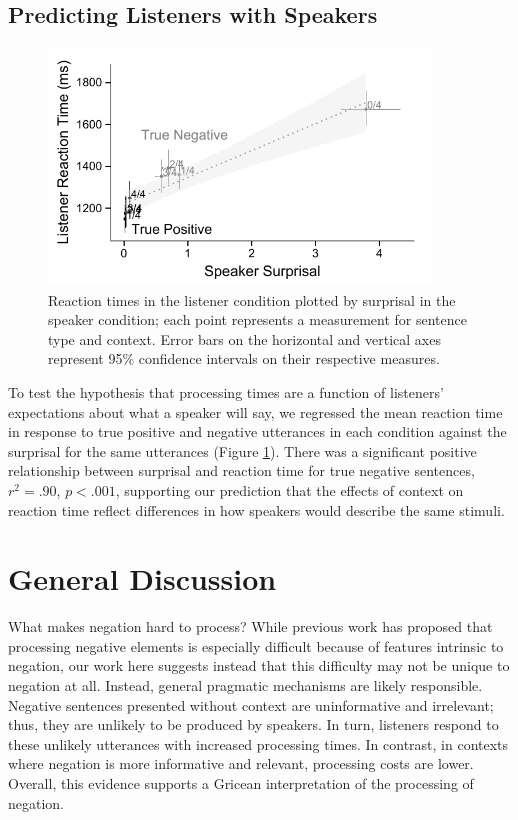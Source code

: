 \documentclass[man, noapacite]{apa2}
\begin{document}
\subsection{Predicting Listeners with Speakers}

\begin{figure}[t]
\begin{center} 
\includegraphics[width=4in]{figures/production_rts_mod.pdf}
\caption{\label{fig:scatter} Reaction times in the listener condition plotted by surprisal in the speaker condition; each point represents a measurement for sentence type and context. Error bars on the horizontal and vertical axes represent 95\% confidence intervals on their respective measures.}
\end{center} 
\end{figure}

To test the hypothesis that processing times are a function of listeners' expectations about what a speaker will say, we regressed the mean reaction time in response to true positive and negative utterances in each condition against the surprisal for the same utterances (Figure \ref{fig:scatter}).  There was a significant positive relationship between surprisal and reaction time for true negative sentences, $r^2=.90$, $p<.001$, supporting our prediction that the effects of context on reaction time reflect differences in how speakers would describe the same stimuli.  

\section{General Discussion}

What makes negation hard to process? While previous work has proposed that processing negative elements is especially difficult because of features intrinsic to negation, our work here suggests instead that this difficulty may not be unique to negation at all. Instead, general pragmatic mechanisms are likely responsible. Negative sentences presented without context are uninformative and irrelevant; thus, they are unlikely to be produced by speakers. In turn, listeners respond to these unlikely utterances with increased processing times. In contrast, in contexts where negation is more informative and relevant, processing costs are lower. Overall, this evidence supports a Gricean interpretation of the processing of negation.
\end{document}
